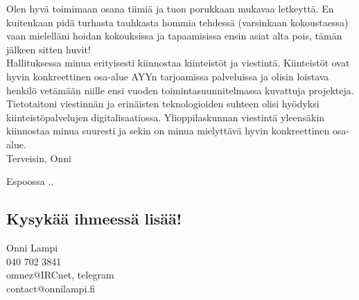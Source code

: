 \documentclass[a4paper, 12pt, finnish]{report}
\newcommand*{\findate}{\the\day.\the\month.\the\year}
\begin{document}
Olen hyvä toimimaan osana tiimiä ja tuon porukkaan mukavaa letkeyttä.
En kuitenkaan pidä turhasta tauhkasta hommia tehdessä (varsinkaan kokoustaessa) vaan mielelläni hoidan kokouksissa ja tapaamisissa ensin asiat alta pois, tämän jälkeen sitten huvit!\\

Hallituksessa minua erityisesti kiinnostaa kiinteistöt ja viestintä.
Kiinteistöt ovat hyvin konkreettinen osa-alue AYYn tarjoamissa palveluissa ja olisin loistava henkilö vetämään niille ensi vuoden toimintasuunnitelmassa kuvattuja projekteja.
Tietotaitoni viestinnän ja erinäisten teknologioiden suhteen olisi hyödyksi kiinteistöpalvelujen digitalisaatiossa.
Ylioppilaskunnan viestintä yleensäkin kiinnostaa minua suuresti ja sekin on minua mielyttävä hyvin konkreettinen osa-alue.\\

Terveisin, Onni

Espoossa \findate

\subsection*{Kysykää ihmeessä lisää!}
Onni Lampi\\
040 702 3841\\
omnez@IRCnet, telegram\\
contact@onnilampi.fi
\end{document}
